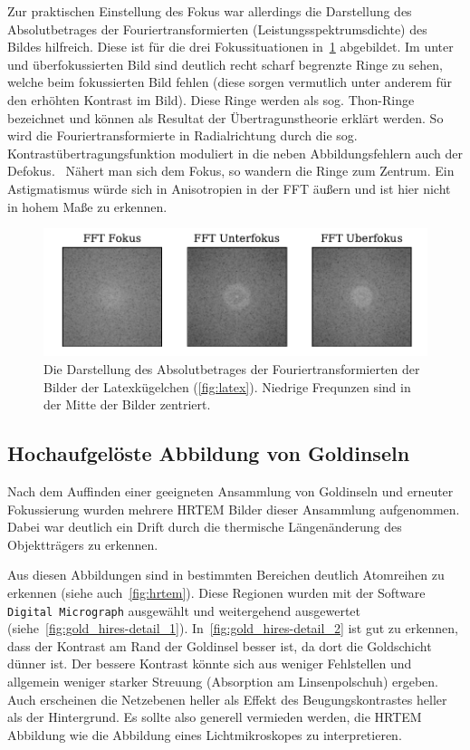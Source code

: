 \documentclass[slug=TEM, room=IFW, supervisor=?, coursedate=23.\ 01.\ 2020]{../../Lab_Report_LaTeX/lab_report}
\begin{document}
Zur praktischen Einstellung des Fokus war allerdings die Darstellung
des Absolutbetrages der Fouriertransformierten
(Leistungsspektrumsdichte) des Bildes hilfreich. Diese ist f\"ur die
drei Fokussituationen in~\ref{fig:latex_kugel-latex_fft}
abgebildet. Im unter und \"uberfokussierten Bild sind deutlich recht
scharf begrenzte Ringe zu sehen, welche beim fokussierten Bild fehlen
(diese sorgen vermutlich unter anderem f\"ur den erh\"ohten Kontrast
im Bild). Diese Ringe werden als sog. Thon-Ringe bezeichnet und
k\"onnen als Resultat der \"Ubertragunstheorie erkl\"art werden. So
wird die Fouriertransformierte in Radialrichtung durch die
sog. Kontrast\"ubertragungsfunktion moduliert in die neben
Abbildungsfehlern auch der Defokus.~\cite{WADE1992145} N\"ahert man
sich dem Fokus, so wandern die Ringe zum Zentrum. Ein Astigmatismus
w\"urde sich in Anisotropien in der FFT \"au\ss{}ern und ist hier
nicht in hohem Ma\ss{}e zu erkennen.

\begin{figure}[h]\centering
  \includegraphics[width=\textwidth]{../auswertung/figs/latex_kugel/latex_fft.pdf}
  \caption{Die Darstellung des Absolutbetrages der
    Fouriertransformierten der Bilder der Latexkügelchen
    (\ref{fig:latex}). Niedrige Frequnzen sind in der Mitte der
    Bilder zentriert.}
  \label{fig:latex_kugel-latex_fft}
\end{figure}

\subsection{Hochaufgel\"oste Abbildung von Goldinseln}
\label{sec:hrtem}

Nach dem Auffinden einer geeigneten Ansammlung von Goldinseln und erneuter
Fokussierung wurden mehrere HRTEM Bilder dieser Ansammlung
aufgenommen. Dabei war deutlich ein Drift durch die thermische
L\"angen\"anderung des Objekttr\"agers zu erkennen.

Aus diesen Abbildungen sind in bestimmten Bereichen deutlich
Atomreihen zu erkennen (siehe auch~\ref{fig:hrtem}). Diese Regionen
wurden mit der Software \verb|Digital Micrograph| ausgew\"ahlt und
weitergehend ausgewertet
(siehe~\ref{fig:gold_hires-detail_1}). In~\ref{fig:gold_hires-detail_2}
ist gut zu erkennen, dass der Kontrast am Rand der Goldinsel besser
ist, da dort die Goldschicht d\"unner ist. Der bessere Kontrast
k\"onnte sich aus weniger Fehlstellen und allgemein weniger starker
Streuung (Absorption am Linsenpolschuh) ergeben. Auch erscheinen die
Netzebenen heller als Effekt des Beugungskontrastes heller als der
Hintergrund. Es sollte also generell vermieden werden, die HRTEM
Abbildung wie die Abbildung eines Lichtmikroskopes zu interpretieren.
\end{document}
